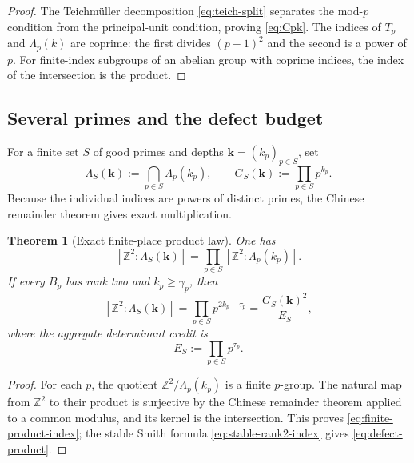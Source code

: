 \documentclass[11pt,oneside]{article}
\newtheorem{theorem}{Theorem}[section]
\theoremstyle{definition}
\newcommand{\Z}{\mathbb{Z}}
\begin{document}
\begin{proof}
The Teichm\"uller decomposition \eqref{eq:teich-split} separates the
mod-$p$ condition from the principal-unit condition, proving
\eqref{eq:Cpk}.  The indices of $T_p$ and $\Lambda_p(k)$ are coprime: the
first divides $(p-1)^2$ and the second is a power of $p$.  For finite-index
subgroups of an abelian group with coprime indices, the index of the
intersection is the product.
\end{proof}

\subsection{Several primes and the defect budget}

For a finite set $S$ of good primes and depths $\bm{k}=(k_p)_{p\in S}$,
set
\begin{equation}\label{eq:Lambda-S}
  \Lambda_S(\bm{k}):=\bigcap_{p\in S}\Lambda_p(k_p),
  \qquad
  G_S(\bm{k}):=\prod_{p\in S}p^{k_p}.
\end{equation}
Because the individual indices are powers of distinct primes, the
Chinese remainder theorem gives exact multiplication.

\begin{theorem}[Exact finite-place product law]\label{thm:finite-product}
One has
\begin{equation}\label{eq:finite-product-index}
  [\Z^2:\Lambda_S(\bm{k})]
  =\prod_{p\in S}[\Z^2:\Lambda_p(k_p)].
\end{equation}
If every $B_p$ has rank two and $k_p\ge\gamma_p$, then
\begin{equation}\label{eq:defect-product}
  [\Z^2:\Lambda_S(\bm{k})]
  =\prod_{p\in S}p^{2k_p-\tau_p}
  =\frac{G_S(\bm{k})^2}{E_S},
\end{equation}
where the aggregate determinant credit is
\begin{equation}\label{eq:defect-budget}
  E_S:=\prod_{p\in S}p^{\tau_p}.
\end{equation}
\end{theorem}

\begin{proof}
For each $p$, the quotient $\Z^2/\Lambda_p(k_p)$ is a finite $p$-group.
The natural map from $\Z^2$ to their product is surjective by the Chinese
remainder theorem applied to a common modulus, and its kernel is the
intersection.  This proves \eqref{eq:finite-product-index}; the stable
Smith formula \eqref{eq:stable-rank2-index} gives
\eqref{eq:defect-product}.
\end{proof}
\end{document}
